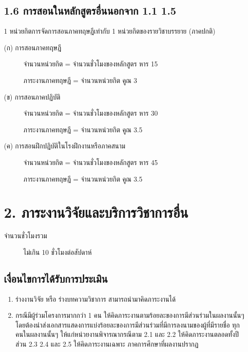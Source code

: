 \documentclass[a4paper,12pt,english]{sphinxmanual}
\begin{document}
\section{1.6 การสอนในหลักสูตรอื่นนอกจาก 1.1 \sphinxhyphen{} 1.5}
\label{\detokenize{1teaching:id20}}
1 หน่วยกิตการจัดการสอนภาคทฤษฎีเท่ากับ 1 หน่วยกิตของรายวิชาบรรยาย (ภาคปกติ)
\begin{description}
\item[{(ก) การสอนภาคทฤษฎี}] \leavevmode
จำนวนหน่วยกิต = จำนวนชั่วโมงของหลักสูตร หาร 15

ภาระงานภาคทฤษฎี = จำนวนหน่วยกิต คูณ 3

\item[{(ข) การสอนภาคปฏิบัติ}] \leavevmode
จำนวนหน่วยกิต = จำนวนชั่วโมงของหลักสูตร หาร 30

ภาระงานภาคทฤษฎี = จำนวนหน่วยกิต คูณ 3.5

\item[{(ค) การสอนฝึกปฏิบัติในโรงฝึกงานหรือภาคสนาม}] \leavevmode
จำนวนหน่วยกิต = จำนวนชั่วโมงของหลักสูตร หาร 45

ภาระงานภาคทฤษฎี = จำนวนหน่วยกิต คูณ 3.5

\end{description}


\chapter{2. ภาระงานวิจัยและบริการวิชาการอื่น}
\label{\detokenize{2research:id1}}\label{\detokenize{2research::doc}}\begin{description}
\item[{จำนวนชั่วโมงรวม}] \leavevmode
ไม่เกิน 10 ชั่วโมงต่อสัปดาห์

\end{description}


\section{เงื่อนไขการได้รับการประเมิน}
\label{\detokenize{2research:id2}}\begin{enumerate}
%
\item {} 
ร่างงานวิจัย หรือ ร่างบทความวิชาการ  สามารถนำมาคิดภาระงานได้

\item {} 
กรณีมีผู้ร่วมโครงการมากกว่า 1 คน ให้คิดภาระงานตามร้อยละของการมีส่วนร่วมในผลงานนั้นๆ โดยต้องนำส่งเอกสารแสดงการแบ่งร้อยละของการมีส่วนร่วมที่มีการลงนามของผู้ที่มีรายชื่อ ทุกคนในผลงานนั้นๆ ให้แก่หน่วยงานพิจารณากรณีตาม 2.1 และ 2.2 ให้คิดภาระงานตลอดทั้งปี ส่วน 2.3 2.4 และ 2.5 ให้คิดภาระงานเฉพาะ ภาคการศึกษาที่ผลงานปรากฏ

\end{enumerate}
\end{document}
